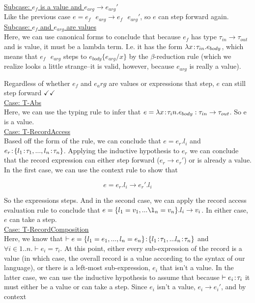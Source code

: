 \documentclass[10pt]{article}
\begin{document}
\begin{exercise}
\begin{enumerate}[\hspace{20pt}]
\begin{enumerate}[\hspace{20pt}]
	\underline{Subcase: $e_f$ is a value and $e_{arg} \rightarrow e_{arg}'$} \\
	Like the previous case $e = e_f \text{ } e_{arg} \rightarrow e_f \text{ } 
	e_{arg}'$, so $e$ can step forward again. \checkmark \\
	
	\underline{Subcase: $e_f$ and $e_{arg}$ are values} \\
	Here, we can use canonical forms to conclude that because $e_f$ has type 
	$\tau_{in} \rightarrow \tau_{out}$ and is value, it must be a lambda term. I.e.
	it has the form $\lambda x\!:\!\tau_{in}.e_{body}$, which means that $e_f
	\text{ }e_{arg}$ steps to
	$e_{body} \{e_{arg} / x\}$ by the $\beta$-reduction rule (which we realize looks 
	a little strange--it is valid, however, because $e_{arg}$ is really a value).
	\checkmark \\
\end{enumerate}

Regardless of whether $e_f$ and $e_arg$ are values or expressions that step, $e$ 
can still step forward $\checkmark \checkmark$ \\

\underline{Case: T-Abs} \\
Here, we can use the typing rule to infer that $e = \lambda x \!:\! 
\tau_in.e_{body} : \tau_{in} \rightarrow \tau_{out}$. So e is a value. \checkmark \checkmark \\

\underline{Case: T-RecordAccess} \\
Based off the form of the rule, we can conclude that $e = e_r.l_i$ and $e_r \!:\! 
\{l_1 \!:\! \tau_1, ... , l_n\!:\!\tau_n\}$. Applying the inductive hypothesis to $e_r$
we can conclude that the record expression can either step forward ($e_r 
\rightarrow e_r'$) or is already a value. In the first case, we can use the context 
rule to show that

$$e = e_r.l_i \rightarrow e_r'.l_i$$

So the expressions steps. And in the second case, we can apply the record access 
evaluation rule to conclude that $e = \{l_1 = v_1, ... \l_n = v_n\}.l_i \rightarrow v_i$. In either case, $e$ can take a step. \checkmark \checkmark \\

\underline{Case: T-RecordComposition} \\
Here, we know that $\vdash e = \{l_1 = e_1, ... , l_n = e_n \} \!:\! \{l_1 \!:\! 
\tau_1, ... l_n \!:\! \tau_n\}$ and $\forall i \in 1..n. \vdash e_i = \tau_i$. At
this point, either every sub-expression of the record is a value (in which case, 
the overall record is a value according to the syntax of our language), or there is 
a left-most sub-expression, $e_i$ that isn't a value. In the latter case, we can 
use the inductive hypothesis to assume that because $\vdash e_i \!:\! \tau_i$ it 
must either be a value or can take a step. Since $e_i$ isn't a value, $e_i 
\rightarrow e_i'$, and by context 


\end{enumerate}
\end{exercise}
\end{document}
